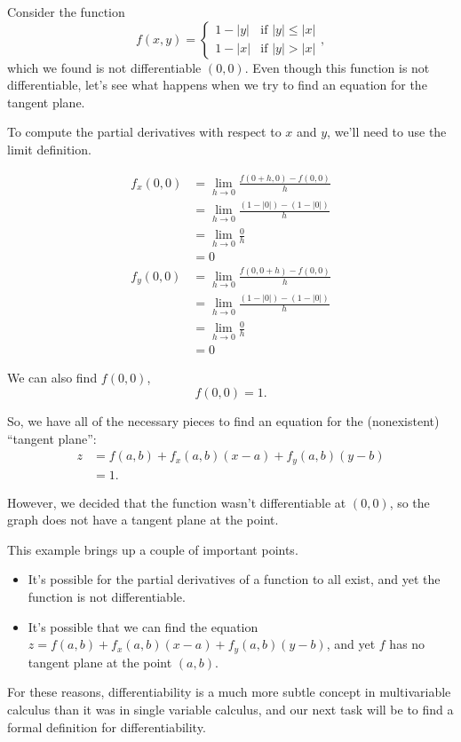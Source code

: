 \documentclass{ximera}
\begin{document}
\begin{example}
Consider the function 
\[
f(x,y) = \begin{cases} 
      1-|y| & \text{if }|y|\leq |x| \\
      1-|x| & \text{if }|y| > |x|
   \end{cases},
\] which we found is not differentiable $(0,0)$. Even though this function is not differentiable, let's see what happens when we try to find an equation for the tangent plane.

To compute the partial derivatives with respect to $x$ and $y$, we'll need to use the limit definition.

\begin{align*}
f_x(0,0) &= \lim_{h\rightarrow 0}\frac{f(0+h,0)-f(0,0)}{h}\\
&= \lim_{h\rightarrow 0}\frac{(1-|0|)-(1-|0|)}{h}\\
&= \lim_{h\rightarrow 0}\frac{0}{h}\\
&= 0\\
f_y(0,0) &= \lim_{h\rightarrow 0}\frac{f(0,0+h)-f(0,0)}{h}\\
&= \lim_{h\rightarrow 0}\frac{(1-|0|)-(1-|0|)}{h}\\
&= \lim_{h\rightarrow 0}\frac{0}{h}\\
&= 0
\end{align*}

We can also find $f(0,0)$,
\[
f(0,0)= 1.
\]

So, we have all of the necessary pieces to find an equation for the (nonexistent) ``tangent plane'':
\begin{align*}
z &=f(a,b)+f_x(a,b)(x-a)+f_y(a,b)(y-b)\\
&= 1.
\end{align*}

However, we decided that the function wasn't differentiable at $(0,0)$, so the graph does not have a tangent plane at the point.

\end{example}

This example brings up a couple of important points.
\begin{itemize}
\item It's possible for the partial derivatives of a function to all exist, and yet the function is not differentiable.
\item It's possible that we can find the equation $z =f(a,b)+f_x(a,b)(x-a)+f_y(a,b)(y-b)$, and yet $f$ has no tangent plane at the point $(a,b)$.
\end{itemize}

For these reasons, differentiability is a much more subtle concept in multivariable calculus than it was in single variable calculus, and our next task will be to find a formal definition for differentiability.
\end{document}

